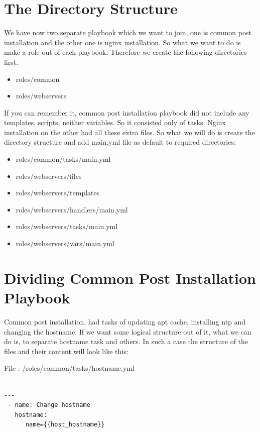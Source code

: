 \documentclass[10pt]{book}
\begin{document}
\section{The Directory Structure}
We have now two separate playbook which we want to join, one is common post 
installation and the other one is nginx installation. So what we want to do is 
make a role out of each playbook. Therefore we create the following directories first.

\begin{itemize}
\item roles/common
\item roles/webservers
\end{itemize}

If you can remember it, common post installation playbook did not include any 
templates, scripts, neither variables. So it consisted only of tasks. Nginx 
installation on the other had all these extra files. So what we will do is create 
the directory structure and add main.yml file as default to required directories:

\begin{itemize}
\item roles/common/tasks/main.yml

\item roles/webservers/files
\item roles/webservers/templates
\item roles/webservers/handlers/main.yml
\item roles/webservers/tasks/main.yml
\item roles/webservers/vars/main.yml
\end{itemize}

\section{Dividing Common Post Installation Playbook}
 Common post installation, had tasks of updating apt cache, installing ntp and 
 changing the hostname. If we want some logical structure out of it, what we can 
 do is, to separate hostname task and others. In such a case the structure of 
 the files and their content will look like this:
 
File : /roles/common/tasks/hostname.yml
\begin{Verbatim} 
 
---
 - name: Change hostname
   hostname: 
      name={{host_hostname}}

\end{Verbatim}
\end{document}
